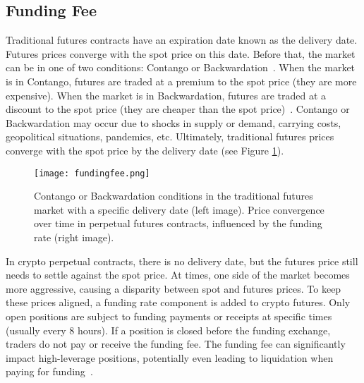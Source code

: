 \subsection{Funding Fee}\label{appx:funding}
Traditional futures contracts have an expiration date known as the delivery date. Futures prices converge with the spot price on this date. Before that, the market can be in one of two conditions: Contango or Backwardation~\cite{cme2020contango}. When the market is in Contango, futures are traded at a premium to the spot price (\ie they are more expensive). When the market is in Backwardation, futures are traded at a discount to the spot price (\ie they are cheaper than the spot price)~\cite{abd2019contango}. Contango or Backwardation may occur due to shocks in supply or demand, carrying costs, geopolitical situations, pandemics, etc. Ultimately, traditional futures prices converge with the spot price by the delivery date (see Figure \ref{fig:fundingfee}).

\begin{figure}[t]
	\centering
	\texttt{[image: fundingfee.png]}
	\caption[Price convergence in the Futures market vs. Perpetuals]{Contango or Backwardation conditions in the traditional futures market with a specific delivery date (left image). Price convergence over time in perpetual futures contracts, influenced by the funding rate (right image).}
	\label{fig:fundingfee}
\end{figure}

In crypto perpetual contracts, there is no delivery date, but the futures price still needs to settle against the spot price. At times, one side of the market becomes more aggressive, causing a disparity between spot and futures prices. To keep these prices aligned, a funding rate component is added to crypto futures. Only open positions are subject to funding payments or receipts at specific times (usually every 8 hours). If a position is closed before the funding exchange, traders do not pay or receive the funding fee. The funding fee can significantly impact high-leverage positions, potentially even leading to liquidation when paying for funding~\cite{Poloniex_FundingFee}.

